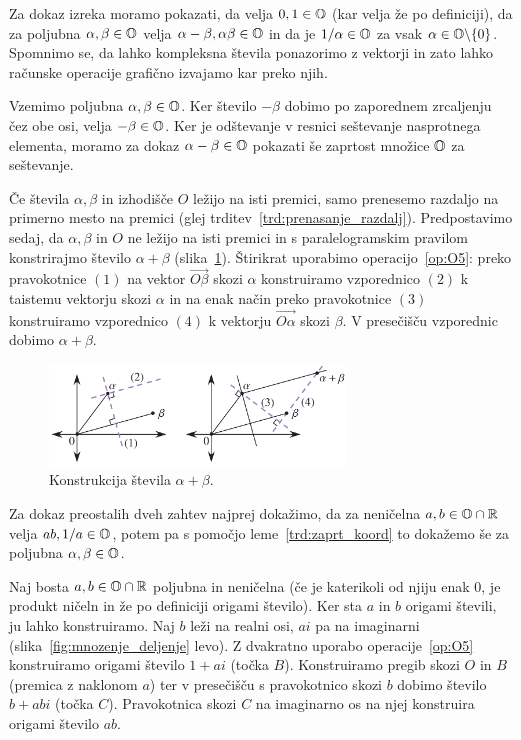 \begin{dokaz}
    Za dokaz izreka moramo pokazati, da velja $0, 1 \in \mathbb O$ (kar velja že po definiciji), da za poljubna $\alpha, \beta \in \mathbb O$ velja $\alpha - \beta, \alpha\beta \in \mathbb O$ in da je $1/\alpha \in \mathbb O$ za vsak $\alpha \in \mathbb O \backslash \{0\}$. Spomnimo se, da lahko kompleksna števila ponazorimo z vektorji in zato lahko računske operacije grafično izvajamo kar preko njih.

    Vzemimo poljubna $\alpha, \beta \in \mathbb O$. Ker število $-\beta$ dobimo po zaporednem zrcaljenju čez obe osi, velja $-\beta \in \mathbb O$. Ker je odštevanje v resnici seštevanje nasprotnega elementa, moramo za dokaz $\alpha - \beta \in \mathbb O$ pokazati še zaprtost množice $\mathbb O$ za seštevanje.

    Če števila $\alpha, \beta$ in izhodišče $O$ ležijo na isti premici, samo prenesemo razdaljo na primerno mesto na premici (glej trditev~\ref{trd:prenasanje_razdalj}). Predpostavimo sedaj, da $\alpha, \beta$ in $O$ ne ležijo na isti premici in s paralelogramskim pravilom konstrirajmo število $\alpha + \beta$ (slika~\ref{fig:sestevanje}). Štirikrat uporabimo operacijo~\ref{op:O5}: preko pravokotnice $(1)$ na vektor $\overrightarrow{O\beta}$ skozi $\alpha$ konstruiramo vzporednico $(2)$ k taistemu vektorju skozi $\alpha$ in na enak način preko pravokotnice $(3)$ konstruiramo vzporednico $(4)$ k vektorju $\overrightarrow{O\alpha}$ skozi $\beta$. V presečišču vzporednic dobimo $\alpha + \beta$.

    \begin{figure}[h]
        \centering
        \includegraphics[width=0.7\textwidth]{images/algebra/sestevanje.png}
        \caption[Seštevanje origami števil]{Konstrukcija števila $\alpha + \beta$.}
        \label{fig:sestevanje}
    \end{figure}

    Za dokaz preostalih dveh zahtev najprej dokažimo, da za neničelna $a, b \in \mathbb O \cap \mathbb R$ velja $ab, 1/a \in \mathbb O$, potem pa s pomočjo leme~\ref{trd:zaprt_koord} to dokažemo še za poljubna $\alpha, \beta \in \mathbb O$.

    Naj bosta $a, b \in \mathbb O \cap \mathbb R$ poljubna in neničelna (če je katerikoli od njiju enak $0$, je produkt ničeln in že po definiciji origami število). Ker sta $a$ in $b$ origami števili, ju lahko konstruiramo. Naj $b$ leži na realni osi, $ai$ pa na imaginarni (slika~\ref{fig:mnozenje_deljenje} levo). Z dvakratno uporabo operacije~\ref{op:O5} konstruiramo origami število $1 + ai$ (točka $B$). Konstruiramo pregib skozi $O$ in $B$ (premica z naklonom $a$) ter v presečišču s pravokotnico skozi $b$ dobimo število $b + abi$ (točka $C$). Pravokotnica skozi $C$ na imaginarno os na njej konstruira origami število $ab$.


\end{dokaz}
